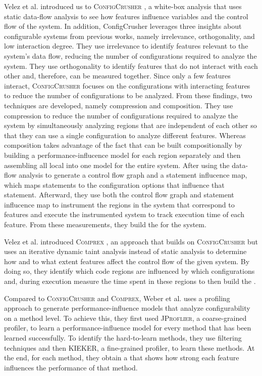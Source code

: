 Velez et al. introduced us to \textsc{ConfigCrusher} \cite{ConfigCrusher}, 
a white-box analysis that uses static data-flow analysis to see how features influence variables and the control flow of the system. 
In addition, ConfigCrusher leverages three insights about configurable systems from previous works, namely irrelevance, orthogonality, 
and low interaction degree. They use irrelevance to identify features relevant to the system's data flow, 
reducing the number of configurations required to analyze the system. They use orthogonality to identify features that do not interact with each other and, 
therefore, can be measured together. Since only a few features interact, 
\textsc{ConfigCrusher} focuses on the configurations with interacting features to reduce the number of configurations to be analyzed. 
From these findings, two techniques are developed, namely compression and composition. 
They use compression to reduce the number of configurations required to analyze the system by simultaneously analyzing regions that are independent of each other 
so that they can use a single configuration to analyze different features. 
Whereas composition takes advantage of the fact that {\perfInfluenceModel} can be built compositionally by building a performance-influcence model 
for each region separately and then assembling all local {\perfInfluenceModel} into one model for the entire system.
After using the data-flow analysis to generate a control flow graph and a statement influcence map, which maps statements to the configuration options 
that influence that statement.
Afterward, they use both the control flow graph and statement influcence map to instrument the regions in the system that correspond to features and execute
the instrumented system to track execution time of each feature. From these measurements, they build the {\perfInfluenceModel} for the system.

Velez et al. introduced \textsc{Comprex} \cite{Comprex}, an approach that builds on \textsc{ConfigCrusher} 
but uses an iterative dynamic taint analysis instead of static analysis to determine how and to what extent features affect the control flow of the given system.
By doing so, they identify which code regions are influenced by which configurations and, during execution measure the time spent in these regions to then build 
the {\perfInfluenceModel}.

Compared to \textsc{ConfigCrusher} and \textsc{Comprex}, Weber et al. 
\cite{White-box-Profiling} uses a profiling approach to generate performance-influence models that analyze configurability on a method level. 
To achieve this, they first used \textsc{JProflier}, a coarse-grained profiler, 
to learn a performance-influence model for every method that has been learned successfully. To identify the hard-to-learn methods, 
they use filtering techniques and then \textsc{KIEKER}, a fine-grained profiler, to learn these methods. At the end, for each method, they
obtain a {\perfInfluenceModel} that shows how strong each feature influences the performance of that method.


